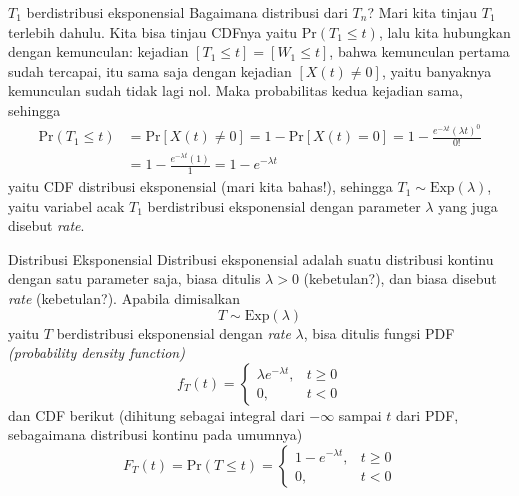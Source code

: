 \documentclass{beamer}
\newcommand{\pars}[1]{\left(#1\right)}
\newcommand{\brackets}[1]{\left[#1\right]}
\begin{document}
\begin{frame}{\(T_1\) berdistribusi eksponensial}
    Bagaimana distribusi dari \(T_n\)? Mari kita tinjau \(T_1\) terlebih dahulu. Kita bisa tinjau CDFnya yaitu \(\text{Pr}(T_1 \le t)\), lalu kita hubungkan dengan kemunculan: kejadian \(\brackets{T_1 \le t} = \brackets{W_1 \le t}\), bahwa kemunculan pertama sudah tercapai, itu sama saja dengan kejadian \(\brackets{X(t) \ne 0}\), yaitu banyaknya kemunculan sudah tidak lagi nol. Maka probabilitas kedua kejadian sama, sehingga
    \begin{align*}
        \text{Pr}\pars{T_1 \le t} &= \text{Pr}\brackets{X(t) \ne 0}
        = 1 - \text{Pr}\brackets{X(t) = 0}
        = 1 - \frac{e^{-\lambda t}\pars{\lambda t}^0}{0!} \\
        &= 1 - \frac{e^{-\lambda t}(1)}{1}
        = 1 - e^{-\lambda t}
    \end{align*}
    yaitu CDF distribusi eksponensial (mari kita bahas!), sehingga \(T_1 \sim \text{Exp}(\lambda)\), yaitu variabel acak \(T_1\) berdistribusi eksponensial dengan parameter \(\lambda\) yang juga disebut \textit{rate}.
\end{frame}

\begin{frame}{Distribusi Eksponensial}
    Distribusi eksponensial adalah suatu distribusi kontinu dengan satu parameter saja, biasa ditulis \(\lambda > 0\) (kebetulan?), dan biasa disebut \textit{rate} (kebetulan?). Apabila dimisalkan
    \[T \sim \text{Exp}(\lambda)\]
    yaitu \(T\) berdistribusi eksponensial dengan \textit{rate} \(\lambda\), bisa ditulis fungsi PDF \textit{(probability density function)}
    \[f_T(t) = \begin{cases}
        \lambda e^{-\lambda t}, & t \ge 0 \\
        0, & t < 0
    \end{cases}\]
    dan CDF berikut (dihitung sebagai integral dari \(-\infty\) sampai \(t\) dari PDF, sebagaimana distribusi kontinu pada umumnya)
    \[F_T(t) = \text{Pr}(T \le t) = \begin{cases}
        1 - e^{-\lambda t}, & t \ge 0 \\
        0, & t < 0
    \end{cases}\]
\end{frame}
\end{document}

